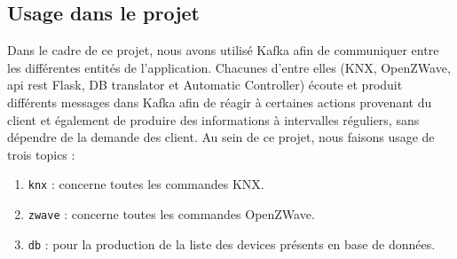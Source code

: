 \subsection{Usage dans le projet}
Dans le cadre de ce projet, nous avons utilisé Kafka afin de communiquer entre les différentes entités de l'application.
Chacunes d'entre elles (KNX, OpenZWave, \acrshort{api} \acrshort{rest} Flask, DB translator et Automatic Controller) écoute et produit différents messages dans Kafka afin de réagir à certaines actions provenant du client et également de produire des informations à intervalles réguliers, sans dépendre de la demande des client. Au sein de ce projet, nous faisons usage de trois topics : 
\begin{enumerate}
    \item \texttt{knx} : concerne toutes les commandes KNX.
    \item \texttt{zwave} : concerne toutes les commandes OpenZWave.
    \item \texttt{db} : pour la production de la liste des devices présents en base de données.
\end{enumerate}
